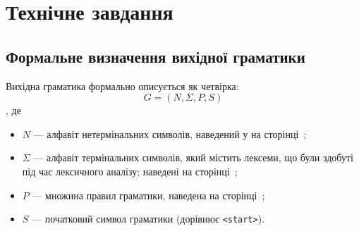 \documentclass[a4paper,12pt,notitlepage,pdftex]{scrreprt}
\begin{document}
\chapter{Технічне завдання}
\label{chap:second}
    \section{Формальне визначення вихідної граматики}
    \label{sec:formal}
        Вихідна граматика формально описується як четвірка:
        \begin{equation}
            \label{eq:grammar}
            G = \left( N, \Sigma, P, S \right)
        \end{equation}
        , де
        \begin{itemize}
            \item $N$ --- алфавіт нетермінальних символів, наведений у на сторінці~\pageref{para:nonterm};
            \item $\Sigma$ --- алфавіт термінальних символів, який містить лексеми, що були здобуті під час лексичного
                аналізу; наведені на сторінці~\pageref{para:term};
            \item $P$ --- множина правил граматики, наведена на сторінці~\pageref{para:rules};
            \item $S$ --- початковий символ граматики (дорівнює \verb'<start>').
        \end{itemize}
\end{document}
